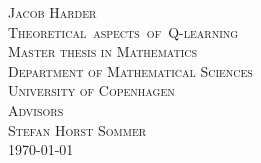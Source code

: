 
\clearpage
\thispagestyle{empty}

\begin{titlingpage}
	\vspace*{5.5cm}
	\noindent
	{\large\textsc{Jacob Harder}}\\[0.5cm]
	{\large\textsc{\mbox{Theoretical aspects of Q-learning}}}\\[0.1cm]
	\vfill\noindent
	{\large\textsc{Master thesis in Mathematics}}\\[0.2cm]
	\noindent
	{\large\textsc{Department of Mathematical Sciences}}\\[0.2cm]
	\noindent
	{\large\textsc{University of Copenhagen}}\\[1cm]
	{\large\textsc{Advisors \\[0.2cm] {\Large Stefan Horst Sommer } }}\\[1cm]
	{\large\textsc{\today}}
	\let\cleardoublepage\clearpage
\end{titlingpage}
\normalfont
\restoregeometry
\cleardoublepage

